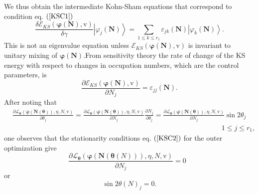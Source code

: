 \documentclass[aps,preprint]{revtex4}%
\begin{document}
We thus obtain the intermediate Kohn-Sham equations that correspond to
condition eq. $\left(  \ref{KSC1}\right)  $
\begin{equation}
\frac{\delta\mathcal{E}_{KS}\left(  \mathbf{\mathbf{\varphi}\left(
\mathbf{N}\right)  ,}\mathrm{v}\right)  }{\delta\gamma}\left\vert \varphi
_{j}\left(  \mathbf{N}\right)  \right\rangle =\sum_{1\leq k\leq r_{1}%
}\varepsilon_{jk}\left(  \mathbf{N}\right)  \left\vert \varphi_{k}\left(
\mathbf{N}\right)  \right\rangle .
\end{equation}
This is not an eigenvalue equation unless $\mathcal{E}_{KS}\left(
\mathbf{\varphi}\left(  \mathbf{N}\right)  ,\mathrm{v}\right)  $ is invariant
to unitary mixing of $\mathbf{\varphi}\left(  \mathbf{N}\right)  .$From
sensitivity theory the rate of change of the KS energy with respect to changes
in occupation numbers, which are the control parameters, is
\begin{equation}
\frac{\partial\mathcal{E}_{KS}\left(  \mathbf{\varphi}\left(  \mathbf{N}%
\right)  ,\mathrm{v}\right)  }{\partial N_{j}}=\varepsilon_{jj}\left(
\mathbf{N}\right)  .
\end{equation}
After noting that
\begin{align}
&  \frac{\partial\mathcal{L}_{\mathbf{\theta}}\left(  \mathbf{\varphi}\left(
\mathbf{N}\left(  \mathbf{\theta}\right)  \right)  ,\eta,N,\mathrm{v}\right)
}{\partial\theta_{j}}=\frac{\partial\mathcal{L}_{\mathbf{\theta}}\left(
\mathbf{\varphi}\left(  \mathbf{N}\left(  \mathbf{\theta}\right)  \right)
,\eta,N,\mathrm{v}\right)  }{\partial N_{j}}\frac{\partial N_{j}}%
{\partial\theta_{j}}=\frac{\partial\mathcal{L}_{\mathbf{\theta}}\left(
\mathbf{\varphi}\left(  \mathbf{N}\left(  \mathbf{\theta}\right)  \right)
,\eta,N,\mathrm{v}\right)  }{\partial N_{j}}\sin2\theta_{j}\,\nonumber\\
&  \qquad\qquad\qquad\qquad\qquad\qquad\qquad\qquad\qquad\qquad\qquad
\qquad\qquad\qquad\qquad1\leq j\leq r_{1},
\end{align}
one observes that the stationarity conditions eq. $\left(  \ref{KSC2}\right)
$ for the outer optimization give
\begin{equation}
\frac{\partial\mathcal{L}_{\mathbf{\theta}}\left(  \mathbf{\varphi}\left(
\mathbf{N}\left(  \mathbf{\theta}\left(  N\right)  \right)  \right)
,\eta\mathbf{,}N\mathbf{,}\mathrm{v}\right)  }{\partial N_{j}}=0\text{ }
\label{out1}%
\end{equation}
or%
\begin{equation}
\sin2\theta\left(  N\right)  _{j}=0. \label{out2}%
\end{equation}
\end{document}
